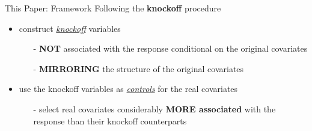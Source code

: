 \begin{frame}{This Paper: Framework}
    Following the \textcolor{glaucous!65!white}{\textbf{knockoff}} procedure {\scriptsize \citep{Barber2015}}
    \begin{itemize}
        \item<+-> construct \textit{\underline{knockoff}} variables
        \begin{itemize}
            \item[-] \textcolor{glaucous!65!white}{\textbf{NOT}} associated with the response conditional on the original covariates
            \item[-] \textcolor{glaucous!65!white}{\textbf{MIRRORING}} the structure of the original covariates
        \end{itemize}
        \item<+-> use the knockoff variables as \textit{\underline{controls}} for the real covariates 
        \begin{itemize}
            \item[-] select real covariates considerably \textcolor{glaucous!65!white}{\textbf{MORE associated}} with the response than their knockoff counterparts
        \end{itemize}
    \end{itemize}

\end{frame}

